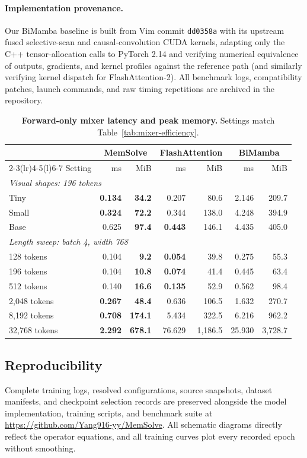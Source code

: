 \documentclass[10pt,twocolumn]{article}
\let\draftsmall\small
\renewcommand{\small}{\draftsmall\fontsize{9}{10}\selectfont}
\begin{document}
\paragraph{Implementation provenance.}
Our BiMamba baseline is built from Vim commit \texttt{dd0358a} with its
upstream fused selective-scan and causal-convolution CUDA kernels, adapting
only the C++ tensor-allocation calls to PyTorch 2.14 and verifying numerical
equivalence of outputs, gradients, and kernel profiles against the reference
path (and similarly verifying kernel dispatch for FlashAttention-2).
All benchmark logs, compatibility patches, launch commands, and raw timing
repetitions are archived in the repository.

\begin{table}[!ht]
\centering
\captionsetup{width=.80\linewidth}
\caption{\textbf{Forward-only mixer latency and peak memory.} Settings match Table~\ref{tab:mixer-efficiency}.}
\label{tab:mixer-forward}
\setlength{\tabcolsep}{10pt}
\renewcommand{\arraystretch}{1.04}
\small
\begin{tabular}{lrrrrrr}
\toprule
&\multicolumn{2}{c}{MemSolve}&\multicolumn{2}{c}{FlashAttention}&\multicolumn{2}{c}{BiMamba}\\
\cmidrule(lr){2-3}\cmidrule(lr){4-5}\cmidrule(l){6-7}
Setting &ms &MiB &ms &MiB &ms &MiB\\
\midrule
\multicolumn{7}{l}{\emph{Visual shapes: 196 tokens}}\\
Tiny &\textbf{0.134} &\textbf{34.2} &0.207 &80.6 &2.146 &209.7\\
Small &\textbf{0.324} &\textbf{72.2} &0.344 &138.0 &4.248 &394.9\\
Base &0.625 &\textbf{97.4} &\textbf{0.443} &146.1 &4.435 &405.0\\
\midrule
\multicolumn{7}{l}{\emph{Length sweep: batch 4, width 768}}\\
128 tokens &0.104 &\textbf{9.2} &\textbf{0.054} &39.8 &0.275 &55.3\\
196 tokens &0.104 &\textbf{10.8} &\textbf{0.074} &41.4 &0.445 &63.4\\
512 tokens &0.140 &\textbf{16.6} &\textbf{0.135} &52.9 &0.562 &98.4\\
2,048 tokens &\textbf{0.267} &\textbf{48.4} &0.636 &106.5 &1.632 &270.7\\
8,192 tokens &\textbf{0.708} &\textbf{174.1} &5.434 &322.5 &6.216 &962.2\\
32,768 tokens &\textbf{2.292} &\textbf{678.1} &76.629 &1,186.5 &25.930 &3,728.7\\
\bottomrule
\end{tabular}
\end{table}

\subsection{Reproducibility}

Complete training logs, resolved configurations, source snapshots, dataset
manifests, and checkpoint selection records are preserved alongside the model
implementation, training scripts, and benchmark suite at
\url{https://github.com/Yang916-yy/MemSolve}.
All schematic diagrams directly reflect the operator equations, and all
training curves plot every recorded epoch without smoothing.
\end{document}
